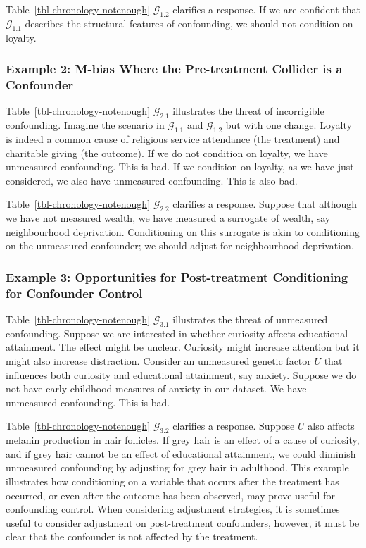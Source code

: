 \documentclass[
  single column]{article}
\begin{document}
Table~\ref{tbl-chronology-notenough} \(\mathcal{G}_{1.2}\) clarifies a
response. If we are confident that \(\mathcal{G}_{1.1}\) describes the
structural features of confounding, we should not condition on loyalty.

\subsubsection{Example 2: M-bias Where the Pre-treatment Collider is a
Confounder}\label{example-2-m-bias-where-the-pre-treatment-collider-is-a-confounder}

Table~\ref{tbl-chronology-notenough} \(\mathcal{G}_{2.1}\) illustrates
the threat of incorrigible confounding. Imagine the scenario in
\(\mathcal{G}_{1.1}\) and \(\mathcal{G}_{1.2}\) but with one change.
Loyalty is indeed a common cause of religious service attendance (the
treatment) and charitable giving (the outcome). If we do not condition
on loyalty, we have unmeasured confounding. This is bad. If we condition
on loyalty, as we have just considered, we also have unmeasured
confounding. This is also bad.

Table~\ref{tbl-chronology-notenough} \(\mathcal{G}_{2.2}\) clarifies a
response. Suppose that although we have not measured wealth, we have
measured a surrogate of wealth, say neighbourhood deprivation.
Conditioning on this surrogate is akin to conditioning on the unmeasured
confounder; we should adjust for neighbourhood deprivation.

\subsubsection{Example 3: Opportunities for Post-treatment Conditioning
for Confounder
Control}\label{example-3-opportunities-for-post-treatment-conditioning-for-confounder-control}

Table~\ref{tbl-chronology-notenough} \(\mathcal{G}_{3.1}\) illustrates
the threat of unmeasured confounding. Suppose we are interested in
whether curiosity affects educational attainment. The effect might be
unclear. Curiosity might increase attention but it might also increase
distraction. Consider an unmeasured genetic factor \(U\) that influences
both curiosity and educational attainment, say anxiety. Suppose we do
not have early childhood measures of anxiety in our dataset. We have
unmeasured confounding. This is bad.

Table~\ref{tbl-chronology-notenough} \(\mathcal{G}_{3.2}\) clarifies a
response. Suppose \(U\) also affects melanin production in hair
follicles. If grey hair is an effect of a cause of curiosity, and if
grey hair cannot be an effect of educational attainment, we could
diminish unmeasured confounding by adjusting for grey hair in adulthood.
This example illustrates how conditioning on a variable that occurs
after the treatment has occurred, or even after the outcome has been
observed, may prove useful for confounding control. When considering
adjustment strategies, it is sometimes useful to consider adjustment on
post-treatment confounders, however, it must be clear that the
confounder is not affected by the treatment.
\end{document}
